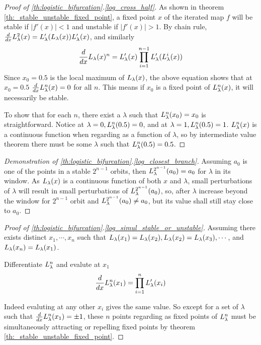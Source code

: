\begin{proof}[Proof of \ref{th:logistic_bifurcation}.\ref{log_cross_half}]
	As shown in theorem \ref{th:_stable_unstable_fixed_point}, a fixed point $x$ of the iterated map $f$ will be stable if $|f'(x)| < 1$ and unstable if $|f'(x)| > 1$.
	By chain rule, 
	$\frac{d}{dx}L_{\lambda}^2 (x) = L_{\lambda}'(L_{\lambda}(x))L_{\lambda}'(x)$, and similarly
	$$
		\frac{d}{dx} L_{\lambda}(x)^n = L_{\lambda}'(x)\prod_{i=1}^{n-1} L_{\lambda}'(L_{\lambda}^i(x))
	$$
	Since $x_0 = 0.5$ is the local maximum of $L_{\lambda}(x)$, the above equation shows that at $x_0 = 0.5$ $\frac{d}{dx} L_{\lambda}^n(x) = 0$ for all $n$.
	This means if $x_0$ is a fixed point of $L_{\lambda}^n(x)$, it will necessarily be stable. 
	
	To show that for each $n$, there exist a $\lambda$ such that $L_{\lambda}^n(x_0) = x_0$ is straightforward. 
	Notice at $\lambda = 0, L_{\lambda}^n(0.5) = 0$, and at $\lambda = 1, L_{\lambda}^n(0.5) = 1$.
	$L_{\lambda}^n(x)$ is a continuous function when regarding as a function of $\lambda$, so by intermediate value theorem there must be some $\lambda$ such that $L_{\lambda}^n(0.5) = 0.5$.
\end{proof}

\begin{proof}[Demonstration of \ref{th:logistic_bifurcation}.\ref{log_closest_branch}]
	Assuming $a_0$ is one of the points in a stable $2^{n-1}$ orbits, then $L_{\lambda}^{2^{n-1}}(a_0)=a_0$ for $\lambda$ in its window.
	As $L_{\lambda}(x)$ is a continuous function of both $x$ and $\lambda$, small perturbations of $\lambda$ will result in small perturbations of $L_{\lambda}^{2^{n-1}}(a_0)$, so, after $\lambda$ increase beyond the window for $2^{n-1}$ orbit and $L_{\lambda}^{2^{n-1}}(a_0) \neq a_0$, but its value shall still stay close to $a_0$.
\end{proof}

\begin{proof}[Proof of \ref{th:logistic_bifurcation}.\ref{log_simul_stable_or_unstable}]
		Assuming there exists distinct $x_1, \cdots, x_n$ such that $L_{\lambda}(x_1) = L_{\lambda}(x_2), L_{\lambda}(x_2) = L_{\lambda}(x_3), \cdots $, and $L_{\lambda}(x_n) = L_{\lambda}(x_1)$.

		Differentiate $L_{\lambda}^n$ and evalute at $x_1$ 
		$$
		\frac{d}{dx} L_{\lambda}^n(x_1) = \prod_{i=1}^n L_{\lambda}'(x_i)
		$$

		Indeed evaluting at any other $x_i$ gives the same value. 
		So except for a set of $\lambda$ such that $\frac{d}{dx} L_{\lambda}^n(x_1) = \pm 1$, these $n$ points regarding as fixed points of $L_{\lambda}^n$ must be simultaneously attracting or repelling fixed points by theorem \ref{th:_stable_unstable_fixed_point}.
\end{proof}

